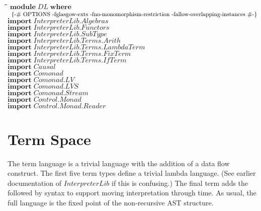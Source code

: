 \documentclass[10pt]{article}
\newlength{\lwidth}\setlength{\lwidth}{4.5cm}
\newlength{\cwidth}\setlength{\cwidth}{8mm} %
\newcommand{\Conid}[1]{\mathit{#1}}
\begin{document}
\begin{tabbing}
\qquad\=\hspace{\lwidth}\=\hspace{\cwidth}\=\+\kill
${\mathbf{module}\;\Conid{DL}\;\mathbf{where}}$\\
${}$\\
${\mbox{\enskip\{-\# OPTIONS -fglasgow-exts -fno-monomorphism-restriction -fallow-overlapping-instances  \#-\}\enskip}}$\\
${}$\\
${\mathbf{import}\;\Conid{\Conid{InterpreterLib}.Algebras}}$\\
${\mathbf{import}\;\Conid{\Conid{InterpreterLib}.Functors}}$\\
${\mathbf{import}\;\Conid{\Conid{InterpreterLib}.SubType}}$\\
${}$\\
${\mathbf{import}\;\Conid{\Conid{InterpreterLib}.\Conid{Terms}.Arith}}$\\
${\mathbf{import}\;\Conid{\Conid{InterpreterLib}.\Conid{Terms}.LambdaTerm}}$\\
${\mathbf{import}\;\Conid{\Conid{InterpreterLib}.\Conid{Terms}.FixTerm}}$\\
${\mathbf{import}\;\Conid{\Conid{InterpreterLib}.\Conid{Terms}.IfTerm}}$\\
${}$\\
${\mathbf{import}\;\Conid{Causal}}$\\
${}$\\
${\mathbf{import}\;\Conid{Comonad}}$\\
${\mathbf{import}\;\Conid{\Conid{Comonad}.LV}}$\\
${\mathbf{import}\;\Conid{\Conid{Comonad}.LVS}}$\\
${\mathbf{import}\;\Conid{\Conid{Comonad}.Stream}}$\\
${}$\\
${\mathbf{import}\;\Conid{\Conid{Control}.Monad}}$\\
${\mathbf{import}\;\Conid{\Conid{Control}.\Conid{Monad}.Reader}}$
\end{tabbing}
\section{Term Space}

The term language is a trivial language with the addition of a data
flow construct.  The first five term types define a trivial lambda
language.  (See earlier documentation of \ensuremath{\Conid{InterpreterLib}} if this is
confusing.)  The final term adds the followed by syntax to support
moving interpretation through time.  As usual, the full language is
the fixed point of the non-recursive AST structure.
\end{document}
